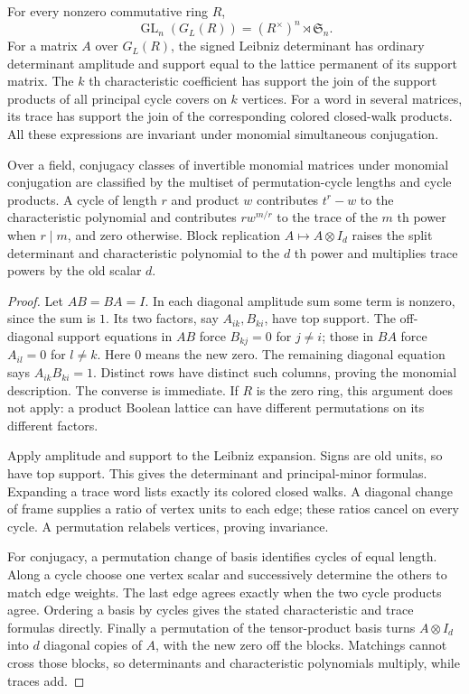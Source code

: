 \begin{proposition}\label{prop:lattice-cycles}
For every nonzero commutative ring $R$,
\[
 \operatorname{GL}_n(G_L(R))=(R^\times)^n\rtimes\mathfrak S_n.
\]
For a matrix $A$ over $G_L(R)$, the signed Leibniz determinant has ordinary
determinant amplitude and support equal to the lattice permanent of its
support matrix. The $k$ th characteristic coefficient has support the join
of the support products of all principal cycle covers on $k$ vertices.
For a word in several matrices, its trace has support the join of the
corresponding colored closed-walk products. All these expressions are
invariant under monomial simultaneous conjugation.

Over a field, conjugacy classes of invertible monomial matrices under monomial conjugation are classified by the multiset
of permutation-cycle lengths and cycle products. A cycle of length $r$
and product $w$ contributes $t^r-w$ to the characteristic polynomial and
contributes $r w^{m/r}$ to the trace of the $m$ th power when $r\mid m$,
and zero otherwise. Block replication $A\mapsto A\otimes I_d$ raises
the split determinant and characteristic polynomial to the $d$ th power
and multiplies trace powers by the old scalar $d$.
\end{proposition}
\begin{proof}
Let $AB=BA=I$. In each diagonal amplitude sum some term is nonzero,
since the sum is $1$. Its two factors, say $A_{ik},B_{ki}$, have top support.
The off-diagonal support equations in $AB$ force $B_{kj}=0$ for $j\ne i$;
those in $BA$ force $A_{i l}=0$ for $l\ne k$. Here $0$ means the new zero.
The remaining diagonal equation says $A_{ik}B_{ki}=1$. Distinct rows have
distinct such columns, proving the monomial description. The converse is
immediate. If $R$ is the zero ring, this argument does not apply: a product
Boolean lattice can have different permutations on its different factors.

Apply amplitude and support to the Leibniz expansion. Signs are old units,
so have top support. This gives the determinant and principal-minor
formulas. Expanding a trace word lists exactly its colored closed walks.
A diagonal change of frame supplies a ratio of vertex units to each edge;
these ratios cancel on every cycle. A permutation relabels vertices,
proving invariance.

For conjugacy, a permutation change of basis identifies cycles of equal
length. Along a cycle choose one vertex scalar and successively determine
the others to match edge weights. The last edge agrees exactly when the
two cycle products agree. Ordering a basis by cycles gives the stated
characteristic and trace formulas directly. Finally a permutation of the
tensor-product basis turns $A\otimes I_d$ into $d$ diagonal copies of $A$,
with the new zero off the blocks. Matchings cannot cross those blocks,
so determinants and characteristic polynomials multiply, while traces add.
\end{proof}

